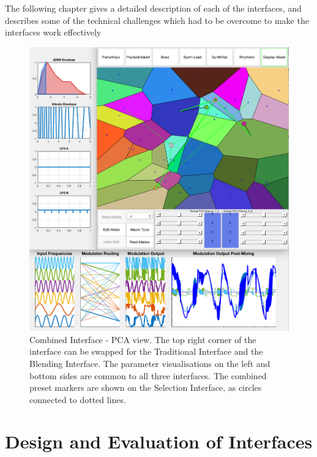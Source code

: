 \documentclass[11pt, oneside]{report}   	%
\begin{document}
The following chapter gives a detailed description of each of the interfaces, and describes some of the technical challenges which had to be overcome to make the interfaces work effectively
\begin{figure}[h] 
	\centering
	\hspace*{-1.5cm}
	\includegraphics[width = 7.5in]{CombinedInterface1.png}
	\caption{Combined Interface - PCA view. The top right corner of the interface can be swapped for the Traditional Interface and the Blending Interface. The parameter visualisations on the left and bottom sides are common to all three interfaces. The combined preset markers are shown on the Selection Interface, as circles connected to dotted lines.}
	\label{fig:CombinedInterface}
\end{figure}

\chapter{Design and Evaluation of Interfaces}
\end{document}
